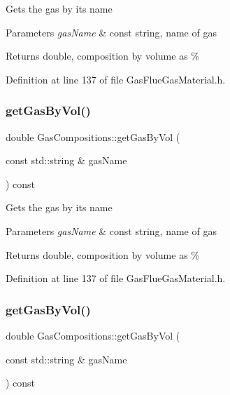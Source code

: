 Gets the gas by its name 
\begin{DoxyParams}{Parameters}
{\em gas\+Name} & const string, name of gas \\
\hline
\end{DoxyParams}
\begin{DoxyReturn}{Returns}
double, composition by volume as \% 
\end{DoxyReturn}


Definition at line 137 of file Gas\+Flue\+Gas\+Material.\+h.

\mbox{\label{class_gas_compositions_a2028a42c136e057a6153b7bfa68d63e6}} 
\subsubsection{\texorpdfstring{get\+Gas\+By\+Vol()}{getGasByVol()}\hspace{0.1cm}{\footnotesize\ttfamily [2/3]}}
{\footnotesize\ttfamily double Gas\+Compositions\+::get\+Gas\+By\+Vol (\begin{DoxyParamCaption}\item[{const std\+::string \&}]{gas\+Name }\end{DoxyParamCaption}) const\hspace{0.3cm}{\ttfamily [inline]}}

Gets the gas by its name 
\begin{DoxyParams}{Parameters}
{\em gas\+Name} & const string, name of gas \\
\hline
\end{DoxyParams}
\begin{DoxyReturn}{Returns}
double, composition by volume as \% 
\end{DoxyReturn}


Definition at line 137 of file Gas\+Flue\+Gas\+Material.\+h.

\mbox{\label{class_gas_compositions_a2028a42c136e057a6153b7bfa68d63e6}} 
\subsubsection{\texorpdfstring{get\+Gas\+By\+Vol()}{getGasByVol()}\hspace{0.1cm}{\footnotesize\ttfamily [3/3]}}
{\footnotesize\ttfamily double Gas\+Compositions\+::get\+Gas\+By\+Vol (\begin{DoxyParamCaption}\item[{const std\+::string \&}]{gas\+Name }\end{DoxyParamCaption}) const\hspace{0.3cm}{\ttfamily [inline]}}

